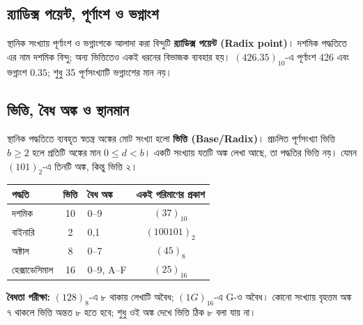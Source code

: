 \subsection{র‍্যাডিক্স পয়েন্ট, পূর্ণাংশ ও ভগ্নাংশ}
স্থানিক সংখ্যায় পূর্ণাংশ ও ভগ্নাংশকে আলাদা করা বিন্দুটি \textbf{র‍্যাডিক্স পয়েন্ট (Radix point)}। দশমিক পদ্ধতিতে এর নাম দশমিক বিন্দু; অন্য ভিত্তিতেও একই ধরনের বিভাজক ব্যবহার হয়। $(426.35)_{10}$-এ পূর্ণাংশ 426 এবং ভগ্নাংশ $0.35$; শুধু 35 পূর্ণসংখ্যাটি ভগ্নাংশের মান নয়।
\begin{center}\begin{chThreeDiagram}\end{chThreeDiagram}\end{center}

\subsection{ভিত্তি, বৈধ অঙ্ক ও স্থানমান}
স্থানিক পদ্ধতিতে ব্যবহৃত স্বতন্ত্র অঙ্কের মোট সংখ্যা হলো \textbf{ভিত্তি (Base/Radix)}। প্রচলিত পূর্ণসংখ্যা ভিত্তি $b\ge2$ হলে প্রতিটি অঙ্কের মান $0\le d<b$। একটি সংখ্যায় যতটি অঙ্ক লেখা আছে, তা পদ্ধতির ভিত্তি নয়। যেমন $(101)_2$-এ তিনটি অঙ্ক, কিন্তু ভিত্তি ২।
\begin{center}\begin{tabularx}{\linewidth}{|L{.22\linewidth}|c|Y|c|}\hline
{}পদ্ধতি&ভিত্তি&বৈধ অঙ্ক&একই পরিমাণের প্রকাশ\\\hline
দশমিক&10&0–9&$(37)_{10}$\\\hline
বাইনারি&2&0,1&$(100101)_2$\\\hline
অক্টাল&8&0–7&$(45)_8$\\\hline
হেক্সাডেসিমাল&16&0–9, A–F&$(25)_{16}$\\\hline
\end{tabularx}\end{center}
\textbf{বৈধতা পরীক্ষা:} $(128)_8$-এ ৮ থাকায় লেখাটি অবৈধ; $(1G)_{16}$-এ G-ও অবৈধ। কোনো সংখ্যায় বৃহত্তম অঙ্ক ৭ থাকলে ভিত্তি অন্তত ৮ হতে হবে; শুধু ওই অঙ্ক দেখে ভিত্তি ঠিক ৮ বলা যায় না।

